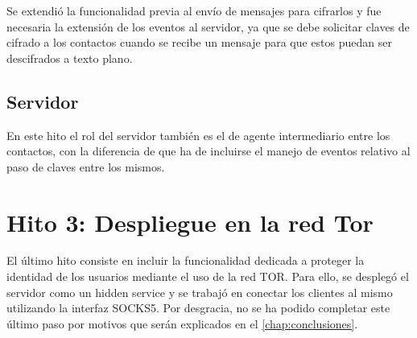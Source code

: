 Se extendió la funcionalidad previa al envío de mensajes para cifrarlos y fue necesaria la extensión de los eventos al servidor, ya que se debe solicitar claves de cifrado a los contactos cuando se recibe un mensaje para que estos puedan ser descifrados a texto plano.

\subsection{Servidor}

En este hito el rol del servidor también es el de agente intermediario entre los contactos, con la diferencia de que ha de incluirse el manejo de eventos relativo al paso de claves entre los mismos.

\newpage

\section{Hito 3: Despliegue en la red Tor}

El último hito consiste en incluir la funcionalidad dedicada a proteger la identidad de los usuarios mediante el uso de la red TOR. Para ello, se desplegó el servidor como un hidden service y se trabajó en conectar los clientes al mismo utilizando la interfaz SOCKS5. Por desgracia, no se ha podido completar este último paso por motivos que serán explicados en el \autoref{chap:conclusiones}. \\ 
